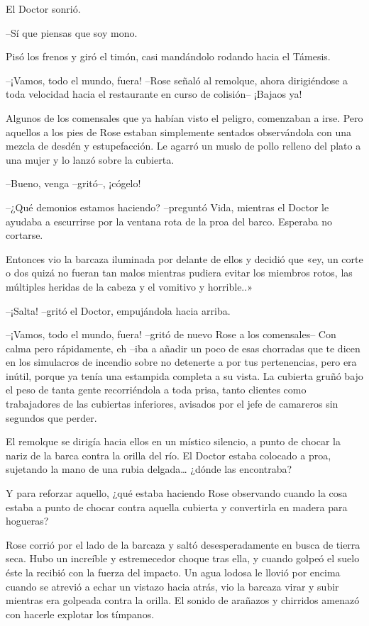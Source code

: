 {El Doctor sonrió.}

{--Sí que piensas que soy mono.}

{Pisó los frenos y giró el timón, casi mandándolo rodando hacia el
Támesis.}

\mbox{}

{--¡Vamos, todo el mundo, fuera! --Rose señaló al remolque, ahora
 dirigiéndose a toda velocidad hacia el restaurante en curso de
colisión-- ¡Bajaos ya!}

{Algunos de los comensales que ya habían visto el peligro, comenzaban a
 irse. Pero aquellos a los pies de Rose estaban simplemente sentados
 observándola con una mezcla de desdén y estupefacción. Le agarró un
 muslo de pollo relleno del plato a una mujer y lo lanzó sobre la
cubierta.}

{--Bueno, venga --gritó--, ¡cógelo!}

\mbox{}

{--¿Qué demonios estamos haciendo? --preguntó Vida, mientras el Doctor
 le ayudaba a escurrirse por la ventana rota de la proa del barco.
Esperaba no cortarse.}

{Entonces vio la barcaza iluminada por delante de ellos y decidió que
 «ey, un corte o dos quizá no fueran tan malos mientras pudiera evitar
 los miembros rotos, las múltiples heridas de la cabeza y el vomitivo y
horrible..»}

{--¡Salta! --gritó el Doctor, empujándola hacia arriba.}

\mbox{}

{--¡Vamos, todo el mundo, fuera! --gritó de nuevo Rose a los
 comensales-- Con calma pero rápidamente, eh --iba a añadir un poco de
 esas chorradas que te dicen en los simulacros de incendio sobre no
 detenerte a por tus pertenencias, pero era inútil, porque ya tenía una
 estampida completa a su vista. La cubierta gruñó bajo el peso de tanta
 gente recorriéndola a toda prisa, tanto clientes como trabajadores de
 las cubiertas inferiores, avisados por el jefe de camareros sin segundos
que perder.}

{El remolque se dirigía hacia ellos en un místico silencio, a punto de
 chocar la nariz de la barca contra la orilla del río. El Doctor estaba
 colocado a proa, sujetando la mano de una rubia delgada\ldots{} ¿dónde
las encontraba?}

{Y para reforzar aquello, ¿qué estaba haciendo Rose observando cuando la
 cosa estaba a punto de chocar contra aquella cubierta y convertirla en
madera para hogueras?}

{Rose corrió por el lado de la barcaza y saltó desesperadamente en busca
 de tierra seca. Hubo un increíble y estremecedor choque tras ella, y
 cuando golpeó el suelo éste la recibió con la fuerza del impacto. Un
 agua lodosa le llovió por encima cuando se atrevió a echar un vistazo
 hacia atrás, vio la barcaza virar y subir mientras era golpeada contra
 la orilla. El sonido de arañazos y chirridos amenazó con hacerle
explotar los tímpanos.}

